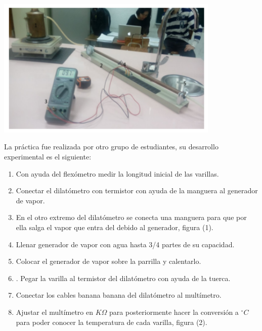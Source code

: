 \documentclass[DIV=calc, paper=a4, fontsize=11pt]{scrartcl}
\newenvironment{Figura}
  {\par\medskip\noindent\minipage{\linewidth}}
  {\endminipage\par\medskip}
\begin{document}
\begin{multicols}{2}
\begin{Figura}
\centering
    \includegraphics[width=0.8\textwidth]{dilatacion 1.PNG}
    \label{fig}
\end{Figura}

La práctica fue realizada por otro grupo de estudiantes, su desarrollo experimental es el siguiente:

\begin{enumerate}
    \item Con ayuda del flexómetro medir la longitud inicial de las varillas.
    
    \item Conectar el dilatómetro con termistor con ayuda de la manguera al generador de vapor.
    
    \item En el otro extremo del dilatómetro se conecta una manguera para que por ella salga el vapor que entra del debido al generador, figura (1).
    
    \item Llenar generador de vapor con agua hasta 3/4 partes de su capacidad.
    
    \item Colocar el generador de vapor sobre la parrilla y calentarlo.
    
    \item . Pegar la varilla al termistor del dilatómetro con ayuda de la tuerca.
    
    \item Conectar los cables banana banana del dilatómetro al multímetro.
    
    \item Ajustar el multímetro en $K\Omega$ para posteriormente hacer la conversión a $^{\circ}C$ para poder conocer la temperatura de cada varilla, figura (2).
    

\end{enumerate}
\end{multicols}
\end{document}
